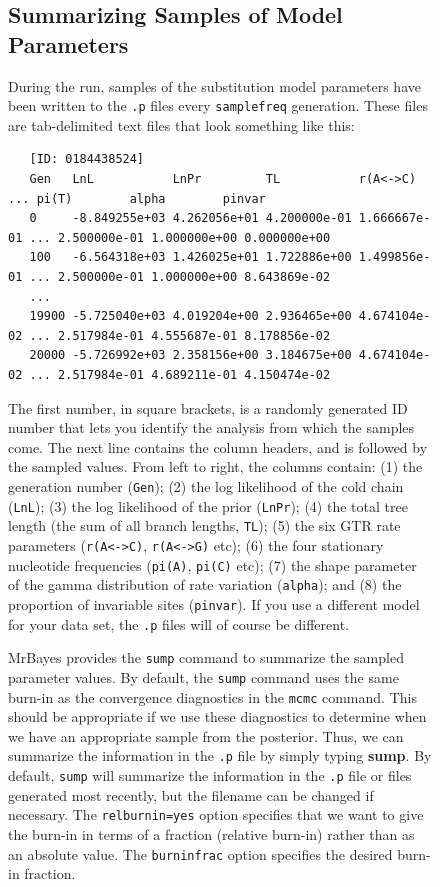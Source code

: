 \documentclass[12pt]{book}
\newcommand{\ttt}[1]{\texttt{#1}}
\begin{document}
\begin{figure}[h]
\subsection{Summarizing Samples of Model Parameters}

During the run, samples of the substitution model parameters have been written to the \ttt{.p}
files every \ttt{samplefreq} generation. These files are tab-delimited text files that look
something like this:

\begin{singlespacing}
\scriptsize
\begin{verbatim}
   [ID: 0184438524]
   Gen   LnL           LnPr         TL           r(A<->C)     ... pi(T)        alpha        pinvar
   0     -8.849255e+03 4.262056e+01 4.200000e-01 1.666667e-01 ... 2.500000e-01 1.000000e+00 0.000000e+00
   100   -6.564318e+03 1.426025e+01 1.722886e+00 1.499856e-01 ... 2.500000e-01 1.000000e+00 8.643869e-02
   ...
   19900 -5.725040e+03 4.019204e+00 2.936465e+00 4.674104e-02 ... 2.517984e-01 4.555687e-01 8.178856e-02
   20000 -5.726992e+03 2.358156e+00 3.184675e+00 4.674104e-02 ... 2.517984e-01 4.689211e-01 4.150474e-02
\end{verbatim}
\normalsize
\end{singlespacing}

The first number, in square brackets, is a randomly generated ID number that lets you identify the
analysis from which the samples come. The next line contains the column headers, and is followed by
the sampled values. From left to right, the columns contain: (1) the generation number (\ttt{Gen});
(2) the log likelihood of the cold chain (\ttt{LnL}); (3) the log likelihood of the prior
(\ttt{LnPr});
(4) the total tree length (the sum of all branch lengths, \ttt{TL}); (5) the six GTR rate
parameters (\ttt{r(A<->C)}, \ttt{r(A<->G)} etc); (6) the four stationary nucleotide frequencies
(\ttt{pi(A)}, \ttt{pi(C)} etc); (7) the shape parameter of the gamma distribution of rate variation
(\ttt{alpha}); and (8) the proportion of invariable sites (\ttt{pinvar}). If you use a different
model for your data set, the \ttt{.p} files will of course be different.

MrBayes provides the \ttt{sump} command to summarize the sampled parameter values. By default, the
\ttt{sump} command uses the same burn-in as the convergence diagnostics in the \ttt{mcmc} command.
This should be appropriate if we use these diagnostics to determine when we have an appropriate
sample from the posterior. Thus, we can summarize the information in the \ttt{.p} file by simply
typing \textbf{sump}. By default, \ttt{sump} will summarize the information in the \ttt{.p} file or
files generated most recently, but the filename can be changed if necessary. The
\ttt{relburnin=yes} option specifies that we want to give the burn-in in terms of a fraction
(relative burn-in) rather than as an absolute value. The \ttt{burninfrac} option specifies the
desired burn-in fraction.


\end{figure}
\end{document}

